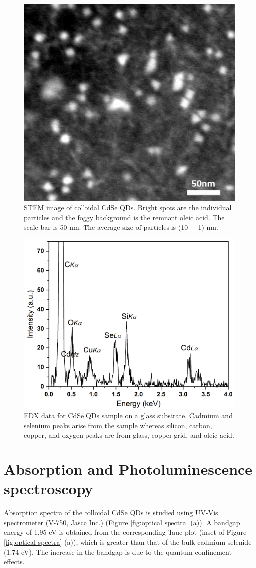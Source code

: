 \documentclass[%
 aip,
 amsmath,amssymb,
 reprint,%
]{revtex4-1}
\begin{document}
\begin{figure}
    \centering
    \includegraphics[width=0.7\linewidth]{STEM image CdSe.png}
    \caption{STEM image of colloidal CdSe QDs. Bright spots are the individual particles and the foggy background is the remnant oleic acid. The scale bar is 50 nm. The average size of particles is (10 $\pm$ 1) nm.}
    \label{fig:CdSe_STEM_image}
\end{figure}


\begin{figure}
    \centering
    \includegraphics[width=0.8\linewidth]{EDX data.png}
    \caption{EDX data for CdSe QDs sample on a glass substrate. Cadmium and selenium peaks arise from the sample whereas silicon, carbon, copper, and oxygen peaks are from glass, copper grid, and oleic acid.}
    \label{fig:EDX}
\end{figure}


\section{\textbf{Absorption and Photoluminescence spectroscopy}}
Absorption spectra of the colloidal CdSe QDs is studied using UV-Vis spectrometer (V-750, Jasco Inc.) (Figure \ref{fig:optical spectra} (a)). A bandgap energy of 1.95 eV is obtained from the corresponding Tauc plot (inset of Figure \ref{fig:optical spectra} (a)), which is greater than that of the bulk cadmium selenide (1.74 eV). The increase in the bandgap is due to the quantum confinement effects.
\end{document}
